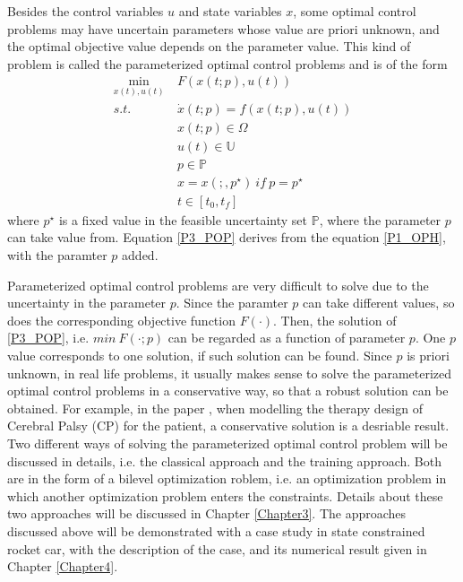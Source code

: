 \documentclass  [
  paper    = a4,
  BCOR     = 10mm,
  twoside,
  fontsize = 12pt,
  fleqn,
  toc      = bibnumbered,
  toc      = listofnumbered,
  numbers  = noendperiod,
  headings = normal,
  listof   = leveldown,
  version  = 3.03
]                                       {scrreprt}
\newcommand{\<}{\langle}
\renewcommand{\>}{\rangle}
\begin{document}
Besides the control variables $u$ and state variables $x$, some optimal control problems may have  uncertain parameters whose value are priori unknown, and the optimal objective value depends on the parameter value. This kind of problem is called the parameterized optimal control problems and is of the form 
      \begin{equation}
	\begin{aligned}
	\underset{x(t), u(t)}{\text{min}}  \ &  F(x(t;p), u(t)) \\
	s.t.\ \  &  \dot{x} (t;p) = f(x(t;p), u(t))\\ 
	& x(t;p) \in \Omega \\
	& u(t) \in \mathbb{U}  \\
	& p  \in   \mathbb{P}  \\
	& x = x(;,p^\star) \ if \ p = p^\star \\
	& t \in [t_0, t_f]
\end{aligned}
\label{P3_POP}
\end{equation}
where $p^\star$ is a fixed value in the feasible uncertainty set $ \mathbb{P}$, where the parameter $p$ can take value from. Equation \ref{P3_POP} derives from the equation \ref{P1_OPH}, with the paramter $p$ added.  

Parameterized optimal control problems are very difficult to solve due to the uncertainty in the parameter $p$. Since the paramter $p$ can take different values, so does the corresponding  objective function $F(\cdot)$. Then, the solution of \ref{P3_POP},  i.e. $min \  F(\cdot; p)$ can be regarded as a function of parameter $p$. One $p$ value corresponds to one solution, if such solution can be found. Since $p$ is priori unknown, in real life problems, it usually makes sense to solve the parameterized optimal control problems in a conservative way, so that a robust solution can be obtained. For example, in the paper \cite{MatSch22}, when modelling the therapy design of Cerebral Palsy (CP) for the patient, a conservative solution is a desriable result. Two different ways of solving the parameterized optimal control problem will be discussed in details, i.e. the classical approach and the training approach. Both are in the form of a bilevel optimization roblem, i.e. an optimization problem in which another optimization problem enters the constraints. Details about these two approaches will be discussed in Chapter \ref{Chapter3}. 
The approaches discussed above will be demonstrated with a case study in state constrained rocket car, with the description of the case, and its numerical result given in Chapter \ref{Chapter4}.  
\end{document}
